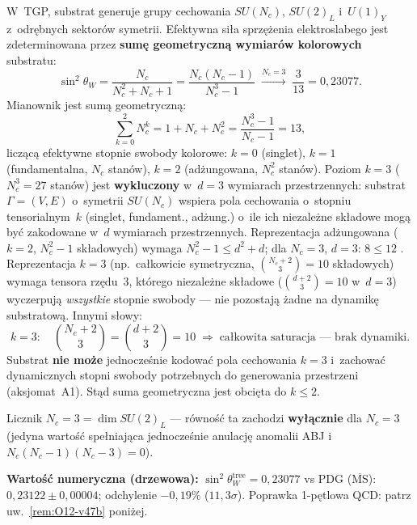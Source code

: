 \begin{proposition}%
\label{prop:sin2thetaW}
W~TGP, substrat generuje grupy cechowania
$SU(N_c)$, $SU(2)_L$ i~$U(1)_Y$ z~odr\k{e}bnych sektor\'ow symetrii.
Efektywna si\l{}a sprz\k{e}\.zenia elektroslabego jest
zdeterminowana przez \textbf{sum\k{e} geometryczn\k{a} wymiar\'ow
kolorowych} substratu:
\begin{equation}\label{eq:sin2thetaW-TGP}
  \boxed{\sin^2\theta_W
    = \frac{N_c}{N_c^2 + N_c + 1}
    = \frac{N_c(N_c - 1)}{N_c^3 - 1}
    \;\xrightarrow{N_c = 3}\;
    \frac{3}{13} = 0{,}23077.}
\end{equation}
Mianownik jest sum\k{a} geometryczn\k{a}:
\begin{equation}
  \sum_{k=0}^{2} N_c^k = 1 + N_c + N_c^2
  = \frac{N_c^3 - 1}{N_c - 1} = 13,
\end{equation}
licz\k{a}c\k{a} efektywne stopnie swobody kolorowe:
$k{=}0$ (singlet), $k{=}1$ (fundamentalna, $N_c$ stan\'ow),
$k{=}2$ (ad\.zungowana, $N_c^2$ stan\'ow).
Poziom $k{=}3$ ($N_c^3 = 27$ stan\'ow) jest \textbf{wykluczony}
w~$d{=}3$ wymiarach przestrzennych:
substrat $\Gamma = (V, E)$ o~symetrii $SU(N_c)$ wspiera
pola cechowania o~stopniu tensorialnym~$k$ (singlet, fundament.,
ad\.zung.) o~ile ich niezale\.zne sk\l{}adowe mog\k{a}
by\'c zakodowane w~$d$ wymiarach przestrzennych.
Reprezentacja ad\.zungowana ($k{=}2$, $N_c^2{-}1$ sk\l{}adowych)
wymaga $N_c^2 - 1 \le d^2 + d$; dla $N_c = 3$, $d = 3$:
$8 \le 12$ \checkmark.
Reprezentacja $k{=}3$ (np.\ ca\l{}kowicie symetryczna,
$\binom{N_c+2}{3} = 10$ sk\l{}adowych) wymaga
tensora rz\k{e}du~3, kt\'orego niezale\.zne sk\l{}adowe
($\binom{d+2}{3} = 10$ w~$d=3$) wyczerpuj\k{a} \emph{wszystkie}
stopnie swobody --- nie pozostaj\k{a} \.zadne na dynamik\k{e}
substratow\k{a}. Innymi s\l{}owy:
\begin{equation}
  k = 3:\quad \binom{N_c+2}{3} = \binom{d+2}{3} = 10
  \;\Longrightarrow\; \text{ca\l{}kowita saturacja --- brak dynamiki.}
\end{equation}
Substrat \textbf{nie mo\.ze} jednocze\'snie kodowa\'c pola
cechowania $k{=}3$ i~zachowa\'c dynamicznych stopni swobody
potrzebnych do generowania przestrzeni (aksjomat~A1).
St\k{a}d suma geometryczna jest obci\k{e}ta do $k \le 2$.

Licznik $N_c = 3 = \dim SU(2)_L$ --- r\'owno\'s\'c ta zachodzi
\textbf{wy\l{}\k{a}cznie} dla $N_c = 3$ (jedyna warto\'s\'c
spe\l{}niaj\k{a}ca jednocze\'snie anulacj\k{e} anomalii ABJ
i~$N_c(N_c{-}1)(N_c{-}3) = 0$).

\textbf{Warto\'s\'c numeryczna (drzewowa):}
$\sin^2\theta_W^{\mathrm{tree}} = 0{,}23077$
vs PDG ($\overline{\mathrm{MS}}$): $0{,}23122 \pm 0{,}00004$;
odchylenie $-0{,}19\%$ ($11{,}3\sigma$).
Poprawka 1-p\k{e}tlowa QCD: patrz uw.~\ref{rem:O12-v47b} poni\.zej.
\end{proposition}

